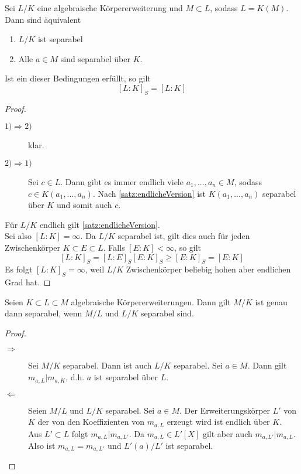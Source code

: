 	\begin{kor}
		Sei $L/K$ eine algebraische Körpererweiterung und $M\subset L$, sodass $L=K(M)$. Dann sind äquivalent
		\begin{enumerate}
			\item $L/K$ ist separabel
			\item Alle $a\in M$ sind separabel über $K$.
		\end{enumerate}
		Ist ein dieser Bedingungen erfüllt, so gilt
		\[[L:K]_S=[L:K]\]
	\end{kor}
	\begin{proof}
		\begin{description}
			\item[$1)\Rightarrow 2)$] klar.
			\item[$2)\Rightarrow 1)$] Sei $c\in L$. Dann gibt es immer endlich viele $a_1,...,a_n\in M$, sodass $c\in K(a_1,...,a_n)$. Nach \ref{satz:endlicheVersion} ist $K(a_1,...,a_n)$ separabel über $K$ und somit auch $c$.
		\end{description}
		Für $L/K$ endlich gilt \ref{satz:endlicheVersion}.\\
		Sei also $[L:K]=\infty$. Da $L/K$ separabel ist, gilt dies auch für jeden Zwischenkörper $K\subset E\subset L$. Falls $[E:K]<\infty$, so gilt
		\[[L:K]_S=[L:E]_S[E:K]_S\geq[E:K]_S=[E:K]\]
		Es folgt $[L:K]_S=\infty$, weil $L/K$ Zwischenkörper beliebig hohen aber endlichen Grad hat. 
	\end{proof}

	\begin{kor}
		Seien $K\subset L\subset M$ algebraische Körpererweiterungen. Dann gilt $M/K$ ist genau dann separabel, wenn $M/L$ und $L/K$ separabel sind.
	\end{kor}
	\begin{proof}
		\begin{description}
			\item[$\Rightarrow$] Sei $M/K$ separabel. Dann ist auch $L/K$ separabel. Sei $a\in M$. Dann gilt $m_{a,L}|m_{a,K}$, d.h. $a$ ist separabel über $L$.
			\item[$\Leftarrow$] Seien $M/L$ und $L/K$ separabel. Sei $a\in M$. Der Erweiterungskörper $L'$ von $K$ der von den Koeffizienten von $m_{a,L}$ erzeugt wird ist endlich über $K$.\\
			Aus $L'\subset L$ folgt $m_{a,L}|m_{a,L'}$. Da $m_{a,L}\in L'[X]$ gilt aber auch $m_{a,L'}|m_{a,L}$. Also ist $m_{a,L}=m_{a,L'}$ und $L'(a)/L'$ ist separabel.
		\end{description}
	\end{proof}

